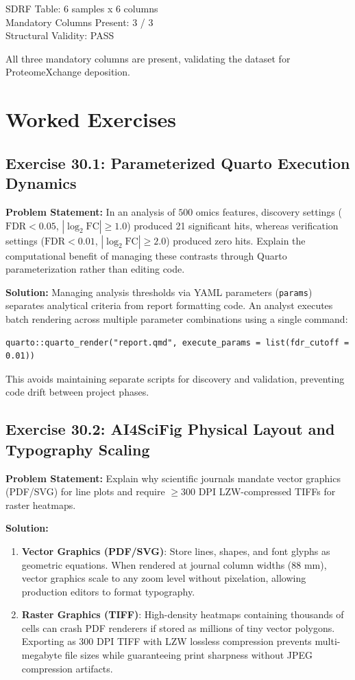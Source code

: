 \documentclass[11pt,twoside,openright]{book}
\begin{document}
\begin{routput}
SDRF Table: 6 samples x 6 columns\\
Mandatory Columns Present: 3 / 3\\
Structural Validity: PASS
\end{routput}

All three mandatory columns are present, validating the dataset for ProteomeXchange deposition.

\FloatBarrier
\section{Worked Exercises}
\label{sec:worked_exercises}

\subsection*{Exercise 30.1: Parameterized Quarto Execution Dynamics}
\noindent\textbf{Problem Statement:}\enspace
In an analysis of $500$ omics features, discovery settings ($\text{FDR} < 0.05$, $|\log_2\text{FC}| \ge 1.0$) produced 21 significant hits, whereas verification settings ($\text{FDR} < 0.01$, $|\log_2\text{FC}| \ge 2.0$) produced zero hits. Explain the computational benefit of managing these contrasts through Quarto parameterization rather than editing code.

\noindent\textbf{Solution:}\enspace
Managing analysis thresholds via YAML parameters (\texttt{params}) separates analytical criteria from report formatting code. An analyst executes batch rendering across multiple parameter combinations using a single command:
\begin{verbatim}
quarto::quarto_render("report.qmd", execute_params = list(fdr_cutoff = 0.01))
\end{verbatim}
This avoids maintaining separate scripts for discovery and validation, preventing code drift between project phases.

\subsection*{Exercise 30.2: AI4SciFig Physical Layout and Typography Scaling}
\noindent\textbf{Problem Statement:}\enspace
Explain why scientific journals mandate vector graphics (PDF/SVG) for line plots and require $\ge 300\text{ DPI}$ LZW-compressed TIFFs for raster heatmaps.

\noindent\textbf{Solution:}\enspace
\begin{enumerate}
\item \textbf{Vector Graphics (PDF/SVG)}: Store lines, shapes, and font glyphs as geometric equations. When rendered at journal column widths ($88\text{ mm}$), vector graphics scale to any zoom level without pixelation, allowing production editors to format typography.
\item \textbf{Raster Graphics (TIFF)}: High-density heatmaps containing thousands of cells can crash PDF renderers if stored as millions of tiny vector polygons. Exporting as $300\text{ DPI}$ TIFF with LZW lossless compression prevents multi-megabyte file sizes while guaranteeing print sharpness without JPEG compression artifacts.
\end{enumerate}
\end{document}
